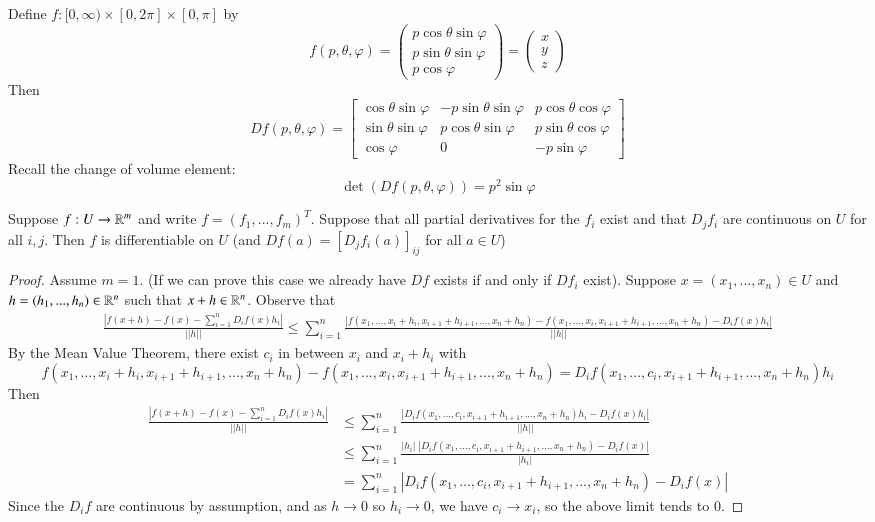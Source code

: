 \begin{eg}
    Define $f:[0,\infty)\times [0,2\pi]\times [0,\pi]$ by $$f(p,\theta,\varphi) = \begin{pmatrix} p\cos\theta\sin\varphi \\ p\sin\theta\sin\varphi \\ p\cos\varphi\end{pmatrix} = \begin{pmatrix} x \\ y \\ z \end{pmatrix}$$ Then $$Df(p,\theta,\varphi) = \begin{bmatrix} \cos\theta\sin\varphi & -p\sin\theta\sin\varphi & p\cos\theta\cos\varphi \\ \sin\theta\sin\varphi & p\cos\theta\sin\varphi & p\sin\theta\cos\varphi \\ \cos\varphi & 0 & -p\sin\varphi \end{bmatrix}$$
    Recall the change of volume element: $$\det(Df(p,\theta,\varphi)) = p^2\sin\varphi$$
\end{eg}

\begin{prop}
    Suppose $f:U\rightarrow \mathbb R^m$ and write $f= (f_1,...,f_m)^T$. Suppose that all partial derivatives for the $f_i$ exist and that $D_jf_i$ are continuous on $U$ for all $i,j$. Then $f$ is differentiable on $U$ (and $Df(a) = [D_jf_i(a)]_{ij}$ for all $a \in U$)
\end{prop}
\begin{proof}
    Assume $m = 1$. (If we can prove this case we already have $Df$ exists if and only if $Df_i$ exist). Suppose $x=(x_1,...,x_n) \in U$ and $h = (h_1,...,h_n) \in \mathbb R^n$ such that $x+h \in \mathbb R^n$. Observe that \begin{align*}
        \frac{|f(x+h) - f(x) - \sum_{i=1}^nD_if(x)h_i|}{||h||} \leq \sum_{i=1}^n\frac{|f(x_1,...,x_i+h_i,x_{i+1}+h_{i+1},...,x_n+h_n) - f(x_1,...,x_i,x_{i+1}+h_{i+1},...,x_n+h_n) -D_if(x)h_i|}{||h||}
    \end{align*}
    By the Mean Value Theorem, there exist $c_i$ in between $x_i$ and $x_i+h_i$ with $$f(x_1,...,x_i+h_i,x_{i+1}+h_{i+1},...,x_n+h_n) - f(x_1,...,x_i,x_{i+1}+h_{i+1},...,x_n+h_n)  = D_if(x_1,...,c_i,x_{i+1}+h_{i+1},...,x_n+h_n)h_i$$ Then \begin{align*}
        \frac{|f(x+h) - f(x) - \sum_{i=1}^nD_if(x)h_i|}{||h||} &\leq \sum_{i=1}^n\frac{|D_if(x_1,...,c_i,x_{i+1}+h_{i+1},...,x_n+h_n)h_i-D_if(x)h_i|}{||h||} \\
        &\leq \sum_{i=1}^n\frac{|h_i|\;|D_if(x_1,...,c_i,x_{i+1}+h_{i+1},...,x_n+h_n)-D_if(x)|}{|h_i|} \\
        &= \sum_{i=1}^n|D_if(x_1,...,c_i,x_{i+1}+h_{i+1},...,x_n+h_n)-D_if(x)|
    \end{align*}
    Since the $D_if$ are continuous by assumption, and as $h\rightarrow 0$ so $h_i\rightarrow 0$, we have $c_i\rightarrow x_i$, so the above limit tends to $0$.
\end{proof}

